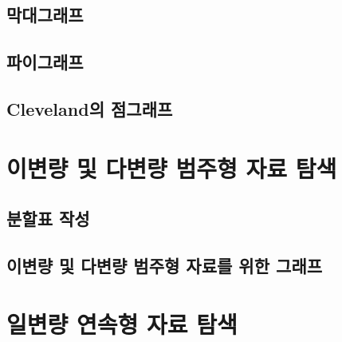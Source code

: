 \documentclass[
]{book}
\begin{document}
\hypertarget{uxb9c9uxb300uxadf8uxb798uxd504}{%
\subsection{막대그래프}\label{uxb9c9uxb300uxadf8uxb798uxd504}}

\hypertarget{uxd30cuxc774uxadf8uxb798uxd504}{%
\subsection{파이그래프}\label{uxd30cuxc774uxadf8uxb798uxd504}}

\hypertarget{clevelanduxc758-uxc810uxadf8uxb798uxd504}{%
\subsection{Cleveland의 점그래프}\label{clevelanduxc758-uxc810uxadf8uxb798uxd504}}

\hypertarget{uxc774uxbcc0uxb7c9-uxbc0f-uxb2e4uxbcc0uxb7c9-uxbc94uxc8fcuxd615-uxc790uxb8cc-uxd0d0uxc0c9}{%
\section{이변량 및 다변량 범주형 자료 탐색}\label{uxc774uxbcc0uxb7c9-uxbc0f-uxb2e4uxbcc0uxb7c9-uxbc94uxc8fcuxd615-uxc790uxb8cc-uxd0d0uxc0c9}}

\hypertarget{uxbd84uxd560uxd45c-uxc791uxc131}{%
\subsection{분할표 작성}\label{uxbd84uxd560uxd45c-uxc791uxc131}}

\hypertarget{uxc774uxbcc0uxb7c9-uxbc0f-uxb2e4uxbcc0uxb7c9-uxbc94uxc8fcuxd615-uxc790uxb8ccuxb97c-uxc704uxd55c-uxadf8uxb798uxd504}{%
\subsection{이변량 및 다변량 범주형 자료를 위한 그래프}\label{uxc774uxbcc0uxb7c9-uxbc0f-uxb2e4uxbcc0uxb7c9-uxbc94uxc8fcuxd615-uxc790uxb8ccuxb97c-uxc704uxd55c-uxadf8uxb798uxd504}}

\hypertarget{uxc77cuxbcc0uxb7c9-uxc5f0uxc18duxd615-uxc790uxb8cc-uxd0d0uxc0c9}{%
\section{일변량 연속형 자료 탐색}\label{uxc77cuxbcc0uxb7c9-uxc5f0uxc18duxd615-uxc790uxb8cc-uxd0d0uxc0c9}}
\end{document}
